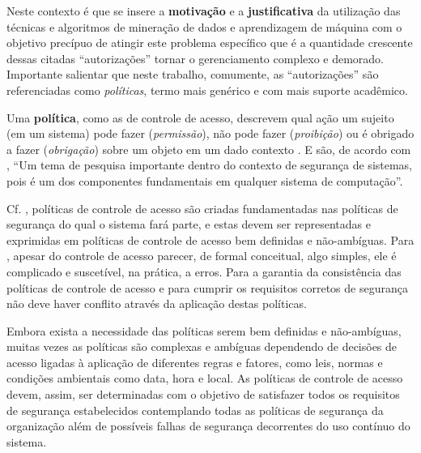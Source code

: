 \documentclass[
	12pt,				%
	openright,			%
	oneside,			%
	a4paper,			%
	english,			%
	french,				%
	spanish,			%
	brazil				%
	]{abntex2}
\begin{document}
Neste contexto é que se insere a \textbf{motivação} e a \textbf{justificativa} da utilização das técnicas e algoritmos de mineração de dados e aprendizagem de máquina com o objetivo precípuo de atingir este problema específico que é a quantidade crescente dessas citadas ``autorizações'' tornar o gerenciamento complexo e demorado. Importante salientar que neste trabalho, comumente, as ``autorizações'' são referenciadas como \textit{políticas}, termo mais genérico e com mais suporte acadêmico. 

Uma \textbf{política}, como as de controle de acesso, descrevem qual ação um sujeito (em um sistema) pode fazer (\textit{permissão}), não pode fazer (\textit{proibição}) ou é obrigado a fazer (\textit{obrigação}) sobre um objeto em um dado contexto \cite{sarkis2017}. E são, de acordo com , ``Um tema de pesquisa importante dentro do contexto de segurança de sistemas, pois é um dos componentes fundamentais em qualquer sistema de computação''.



Cf. , políticas de controle de acesso são criadas fundamentadas nas políticas de segurança do qual o sistema fará parte, e estas devem ser representadas e exprimidas em políticas de controle de acesso bem definidas e não-ambíguas. Para , apesar do controle de acesso parecer, de formal conceitual, algo simples, ele é complicado e suscetível, na prática, a erros. Para a garantia da consistência das políticas de controle de acesso e para cumprir os requisitos corretos de segurança não deve haver conflito através da aplicação destas políticas.

Embora exista a necessidade das políticas serem bem definidas e não-ambíguas, muitas vezes as políticas são complexas e ambíguas dependendo de decisões de acesso ligadas à aplicação de diferentes regras e fatores, como leis, normas e condições ambientais como data, hora e local. As políticas de controle de acesso devem, assim, ser determinadas com o objetivo de satisfazer todos os requisitos de segurança estabelecidos contemplando todas as políticas de segurança da organização além de possíveis falhas de segurança decorrentes do uso contínuo do sistema. \cite{silva_uma_2018} \cite{sandhu_access_1994}
\end{document}
